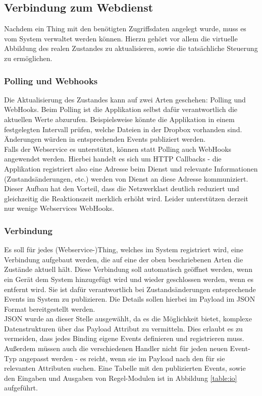 \subsection{Verbindung zum Webdienst}
Nachdem ein Thing mit den benötigten Zugriffsdaten angelegt wurde, muss es vom System verwaltet werden können. Hierzu gehört vor allem die virtuelle Abbildung des realen Zustandes zu aktualisieren, sowie die tatsächliche Steuerung zu ermöglichen. 

\subsubsection{Polling und Webhooks}
Die Aktualisierung des Zustandes kann auf zwei Arten geschehen: Polling und WebHooks. Beim Polling ist die Applikation selbst dafür verantwortlich die aktuellen Werte abzurufen. Beispielsweise könnte die Applikation in einem festgelegten Intervall prüfen, welche Dateien in der Dropbox vorhanden sind. Änderungen würden in entsprechenden Events publiziert werden.\\

Falls der Webservice es unterstützt, können statt Polling auch WebHooks angewendet werden. Hierbei handelt es sich um HTTP Callbacks - die Applikation registriert also eine Adresse beim Dienst und relevante Informationen (Zustandsänderungen, etc.) werden von Dienst an diese Adresse kommuniziert. Dieser Aufbau hat den Vorteil, dass die Netzwerklast deutlich reduziert und gleichzeitig die Reaktionszeit merklich erhöht wird. Leider unterstützen derzeit nur wenige Webservices WebHooks.

\subsubsection{Verbindung}
Es soll für jedes (Webservice-)Thing, welches im System registriert wird, eine Verbindung aufgebaut werden, die auf eine der oben beschriebenen Arten die Zustände aktuell hält. Diese Verbindung soll automatisch geöffnet werden, wenn ein Gerät dem System hinzugefügt wird und wieder geschlossen werden, wenn es entfernt wird. Sie ist dafür verantwortlich bei Zustandsänderungen entsprechende Events im System zu publizieren. Die Details sollen hierbei im Payload im JSON Format bereitgestellt werden.\\

JSON wurde an dieser Stelle ausgewählt, da es die Möglichkeit bietet, komplexe Datenstrukturen über das Payload Attribut zu vermitteln. Dies erlaubt es zu vermeiden, dass jedes Binding eigene Events definieren und registrieren muss. Außerdem müssen auch die verschiedenen Handler nicht für jeden neuen Event-Typ angepasst werden - es reicht, wenn sie im Payload nach den für sie relevanten Attributen suchen. Eine Tabelle mit den publizierten Events, sowie den Eingaben und Ausgaben von Regel-Modulen ist in Abbildung \ref{table:io} aufgeführt.



